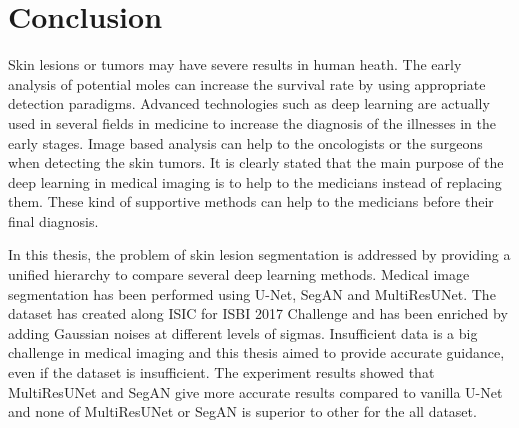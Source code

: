 \chapter{Conclusion}

Skin lesions or tumors may have severe results in human heath.
The early analysis of potential moles can increase the survival rate by using appropriate detection paradigms.
Advanced technologies such as deep learning are actually used in several fields in medicine to increase the diagnosis of the illnesses in the early stages.
Image based analysis can help to the oncologists or the surgeons when detecting the skin tumors.
It is clearly stated that the main purpose of the deep learning in medical imaging is to help to the medicians instead of replacing them.
These kind of supportive methods can help to the medicians before their final diagnosis.

In this thesis, the problem of skin lesion segmentation is addressed by providing a unified hierarchy to compare several deep learning methods.
Medical image segmentation has been performed using U-Net, SegAN and MultiResUNet.
The dataset has created along ISIC for ISBI 2017 Challenge and has been enriched by adding Gaussian noises at different levels of sigmas.
Insufficient data is a big challenge in medical imaging and this thesis aimed to provide accurate guidance, even if the dataset is insufficient.
The experiment results showed that MultiResUNet and SegAN give more accurate results compared to vanilla U-Net and none of MultiResUNet or SegAN is superior to other for the all dataset.
